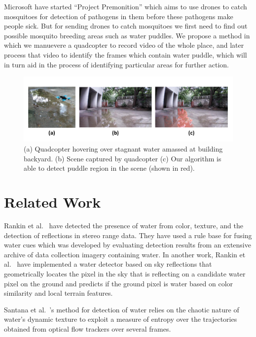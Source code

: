 \documentclass[times,10pt,twocolumn,letterpaper]{article}
\begin{document}
Microsoft \cite{Microsoft15} have started ``Project Premonition'' which aims to
use drones to catch mosquitoes for detection of pathogens in them before these
pathogens make people sick. But for sending drones to catch mosquitoes we first
need to find out possible mosquito breeding areas such as water puddles. We
propose a method in which we manuevere a quadcopter to record video of the
whole place, and later process that video to identify the frames which contain
water puddle, which will in turn aid in the process of identifying particular
areas for further action.

\begin{figure}[h!]
\centering
\includegraphics[width=\linewidth]{images/teaser.pdf}
\caption{(a) Quadcopter hovering over stagnant water amassed at building
backyard. (b) Scene captured by quadcopter (c) Our algorithm is able to detect
puddle region in the scene (shown in red).}
\end{figure}

\section{Related Work}

Rankin et al.~\cite{rankin04} have detected the presence of water from color,
texture, and the detection of reflections in stereo range data. They have used a
rule base for fusing water cues which was developed by evaluating detection
results from an extensive archive of data collection imagery containing water.
In another work, Rankin et al.~\cite{rankin11} have implemented a water detector
based on sky reflections that geometrically locates the pixel in the sky that
is reflecting on a candidate water pixel on the ground and predicts if the
ground pixel is water based on color similarity and local terrain features. 

Santana et al.~\cite{santana12}'s method for detection of water relies on the
chaotic nature of water’s dynamic texture to exploit a measure of entropy over the
trajectories obtained from optical flow trackers over several frames.
\end{document}
